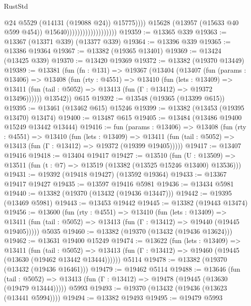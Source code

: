 \begin{lexlean}{RustStd}
\begin{coremodule}
                                                  @24
                                                  @5529
                                                  (@14131 (@19088 @24))
                                                  @15775))))
                                          @15628
                                          (@13957 (@15633 @40 @599 @454))
                                          @15640)))))))))))))))))))
@19359 := @13365 @339
@19363 := @13367 (@13371 @339) (@13377 @339)
@19364 := @13396 @339
@19365 := @13386 @19364
@19367 := @13382 (@19365 @13401)
@19369 := @13424 (@13425 @339)
@19370 := @13420 @19369
@19372 := @13382 (@19370 @13449)
@19389 := @13381
    (fun (fn : @131) =>
    @19367
      (@13404
        (@13407
          (fun (params : @13406) =>
          @13408
            (fun (rty : @4551) =>
            @13410
              (fun (lets : @13409) =>
              @13411 (fun (tail : @5052) => @13413 (fun (Γ : @13412) => @19372 @13496))))))
        @13542))
    @615
@19392 := @13548 (@19365 (@13399 @615))
@19395 := @13461 (@13462 @615) @15246
@19399 := @13382 (@13453 (@19395 @13470) @13474)
@19400 := @13487 @615
@19405 := @13484 (@13486 @19400 @15249 @13442 @13444)
@19416 := fun (params : @13406) =>
  @13408
    (fun (rty : @4551) =>
    @13410
      (fun (lets : @13409) =>
      @13411 (fun (tail : @5052) => @13413 (fun (Γ : @13412) => @19372 (@19399 @19405)))))
@19417 := @13407 @19416
@19418 := @13404 @19417
@19427 := @13510
    (fun (U : @13509) => @13511 (fun (t : @7) => @13519 (@13382 (@13525 @15246 @13400) @13536)))
@19431 := @19392 (@19418 @19427) (@13592 @19364)
@19433 := @13367 @19417 @19427
@19435 := @13597 @19416 @5981
@19436 := @13434 @5981
@19440 := @13382 (@19370 (@13432 (@19436 @13447)))
@19442 := @19395 (@13469 @5981)
@19443 := @13453 @19442
@19445 := @13382 (@19443 @13474)
@19456 := @13600
    (fun (rty : @4551) =>
    @13410
      (fun (lets : @13409) =>
      @13411 (fun (tail : @5052) => @13413 (fun (Γ : @13412) => @19440 (@19445 @19405)))))
    @5035
@19460 := @13382 (@19370 (@13432 (@19436 @13624)))
@19462 := @13631 @19400 @15249
@19474 := @13622
    (fun (lets : @13409) =>
    @13411
      (fun (tail : @5052) =>
      @13413 (fun (Γ : @13412) => @19460 (@19445 (@13630 (@19462 @13442 @13444))))))
    @5114
@19478 := @13382 (@19370 (@13432 (@19436 @16461)))
@19479 := @19462 @5114
@19488 := @13646
    (fun (tail : @5052) => @13413 (fun (Γ : @13412) => @19478 (@19445 (@13630 (@19479 @13444)))))
    @5993
@19493 := @19370 (@13432 (@19436 (@13623 (@13441 @5994))))
@19494 := @13382 @19493
@19495 := @19479 @5993

\end{coremodule}
\end{lexlean}
